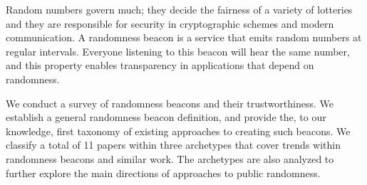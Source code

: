 Random numbers govern much;  they decide the fairness of a variety of lotteries and they are responsible for security in cryptographic schemes and modern communication.
A randomness beacon is a service that emits random numbers at regular intervals.
Everyone listening to this beacon will hear the same number, and this property enables transparency in applications that depend on randomness.%

We conduct a survey of randomness beacons and their trustworthiness.
We establish a general randomness beacon definition, and provide the, to our knowledge, first taxonomy of existing approaches to creating such beacons.
We classify a total of 11 papers within three archetypes that cover trends within randomness beacons and similar work.
The archetypes are also analyzed to further explore the main directions of approaches to public randomness.
